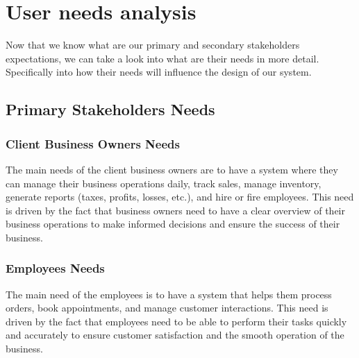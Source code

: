 \documentclass[]{VUMIFTemplateClass}
\begin{document}
\section{User needs analysis}


Now that we know what are our primary and secondary stakeholders expectations,
we can take a look into what are their needs in more detail. Specifically into
how their needs will influence the design of our system.

\subsection{Primary Stakeholders Needs}



\subsubsection{Client Business Owners Needs}

The main needs of the client business owners are to have a system where they 
can manage their business operations daily, track sales, manage inventory,
generate reports (taxes, profits, losses, etc.), and hire or fire employees.
This need is driven by the fact that business owners need to have a clear overview of their
business operations to make informed decisions and ensure the success of their
business.




\subsubsection{Employees Needs}

The main need of the employees is to have a system that helps them process orders,
book appointments, and manage customer interactions. This need is driven by the
fact that employees need to be able to perform their tasks quickly and accurately
to ensure customer satisfaction and the smooth operation of the business.
\end{document}
